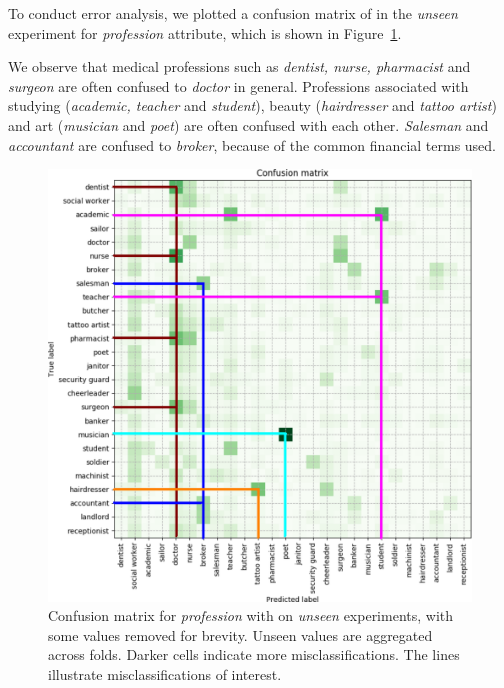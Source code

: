 To conduct error analysis, we plotted a confusion matrix of  in the \emph{unseen} experiment for \emph{profession} attribute, which is shown in Figure~\ref{conf_prof}.

We observe that medical professions such as \textit{dentist, nurse, pharmacist} and \emph{surgeon} are often confused to \textit{doctor} in general. Professions associated with studying (\textit{academic, teacher} and \emph{student}), beauty (\textit{hairdresser} and \emph{tattoo artist}) and art (\textit{musician} and \textit{poet}) are often confused with each other. \textit{Salesman} and \emph{accountant} are confused to \textit{broker}, because of the common financial terms used. 


\begin{figure}[h!]
 \centering
   \centering
   \includegraphics[scale=0.5]{imgs/profession_confusion.pdf}
\vspace{0.3cm}
\caption[Confusion matrix for \emph{profession}  with  on \emph{unseen} experiments]{Confusion matrix for \emph{profession}  with  on \emph{unseen} experiments, with some values removed for brevity. Unseen values are aggregated across folds. 
Darker cells indicate more misclassifications. The lines illustrate misclassifications of interest.
}
   \label{conf_prof}
\end{figure}

